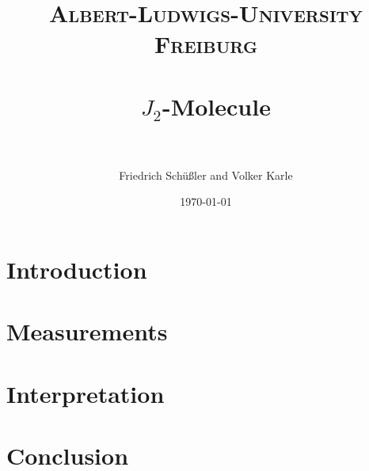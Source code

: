 \documentclass[paper=a4, fontsize=12pt, xcolor=dvipsnames]{scrartcl} %
\title{ 
\normalfont \normalsize 
\textsc{Albert-Ludwigs-University Freiburg} \\ [25pt] %
\horrule{0.5pt} \\[0.4cm] %
\huge $J_2$-Molecule \\ %
\horrule{2pt} \\[0.5cm] %
}
\author{Friedrich Schüßler and Volker Karle} %
\date{\normalsize\today} %
\numberwithin{equation}{section} %
\numberwithin{figure}{section} %
\numberwithin{table}{section} %
\begin{document}
\maketitle

\newpage
\tableofcontents
\thispagestyle{empty}
\newpage
\setcounter{page}{1}




\section{Introduction}



\clearpage
\section{Measurements}
\clearpage
\section{Interpretation}
\clearpage
\section{Conclusion}
\cleardoublepage




\listoffigures
\end{document}
